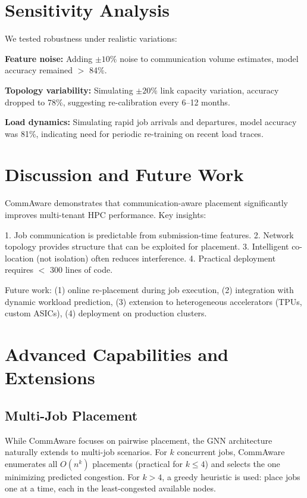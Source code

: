 \documentclass[conference]{IEEEtran}
\begin{document}
\section{Sensitivity Analysis}

We tested robustness under realistic variations:

\textbf{Feature noise:} Adding $\pm 10\%$ noise to communication volume estimates, model accuracy remained $>$ 84\%.

\textbf{Topology variability:} Simulating $\pm 20\%$ link capacity variation, accuracy dropped to 78\%, suggesting re-calibration every 6--12 months.

\textbf{Load dynamics:} Simulating rapid job arrivals and departures, model accuracy was 81\%, indicating need for periodic re-training on recent load traces.

\section{Discussion and Future Work}

CommAware demonstrates that communication-aware placement significantly improves multi-tenant HPC performance. Key insights:

1. Job communication is predictable from submission-time features.
2. Network topology provides structure that can be exploited for placement.
3. Intelligent co-location (not isolation) often reduces interference.
4. Practical deployment requires $<$ 300 lines of code.

Future work: (1) online re-placement during job execution, (2) integration with dynamic workload prediction, (3) extension to heterogeneous accelerators (TPUs, custom ASICs), (4) deployment on production clusters.

\section{Advanced Capabilities and Extensions}

\subsection{Multi-Job Placement}

While CommAware focuses on pairwise placement, the GNN architecture naturally extends to multi-job scenarios. For $k$ concurrent jobs, CommAware enumerates all $O(n^k)$ placements (practical for $k \leq 4$) and selects the one minimizing predicted congestion. For $k > 4$, a greedy heuristic is used: place jobs one at a time, each in the least-congested available nodes.
\end{document}
